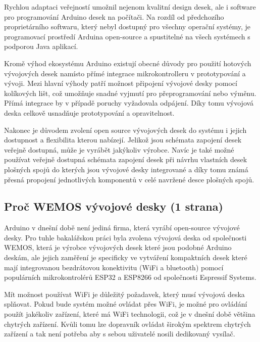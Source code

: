 Rychlou adaptaci veřejností umožnil nejenom kvalitní design desek, ale i software pro programování Arduino desek na počítači. Na rozdíl od předchozího proprietárního softwaru, který nebyl dostupný pro všechny operační systémy, je programovací prostředí Arduina open-source a spustitelné na všech systémech s podporou Java aplikací.
\cite{KnihaOArduinu}

Kromě výhod ekosystému Arduino existují obecné důvody pro použití hotových vývojových desek namísto přímé integrace mikrokontrolleru v prototypování a vývoji. Mezi hlavní výhody patří možnost připojení vývojové desky pomocí kolíkových lišt, což umožňuje snadné vyjmutí pro přeprogramování nebo výměnu. Přímá integrace by v případě poruchy vyžadovala odpájení. Díky tomu vývojová deska celkově usnadňuje prototypování a opravitelnost.

Nakonec je důvodem zvolení open source vývojových desek do systému i jejich dostupnost a flexibilita kterou nabízejí. Jelikož jsou schémata zapojení desek veřejně dostupná, může je vyrábět jakýkoliv výrobce. Navíc je také možné používat veřejně dostupná schémata zapojení desek při návrhu vlastních desek plošných spojů do kterých jsou vývojové desky integrované a díky tomu známá přesná propojení jednotlivých komponentů v celé navržené desce plošných spojů.

\subsection{Proč WEMOS vývojové desky (1 strana)}

Arduino v dnešní době není jediná firma, která vyrábí open-source vývojové desky. Pro tuhle bakalářskou práci byla zvolena vývojová deska od společnosti WEMOS, která je výrobce vývojových desek které jsou podobné Arduino deskám, ale jejich zaměření je specificky ve vytváření kompaktních desek které mají integrovanou bezdrátovou konektivitu (WiFi a bluetooth) pomocí populárních mikrokontrolérů ESP32 a ESP8266 od společnosti Espressif Systems.

Mít možnost používat WiFi je důležitý požadavek, který musí vývojová deska splňovat. Pokud bude systém možné ovládat přes WiFi, je možné pro ovládání použít jakékoliv zařízení, které má WiFi technologii, což je v dnešní době většina chytrých zařízení. Kvůli tomu lze dopravník ovládat širokým spektrem chytrých zařízení a tak není potřeba aby s sebou uživatelé nosili dedikovaný vysílač.

